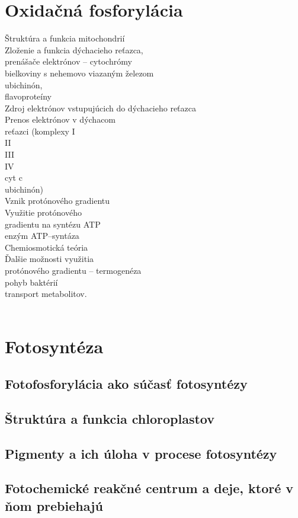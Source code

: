 \section{Oxidačná fosforylácia}
Štruktúra a funkcia mitochondrií\\
Zloženie a funkcia dýchacieho reťazca,\\
prenášače elektrónov -- cytochrómy\\
\tab bielkoviny s nehemovo viazaným železom\\
\tab ubichinón,\\
flavoproteíny\\
Zdroj elektrónov vstupujúcich do dýchacieho reťazca\\
Prenos elektrónov v dýchacom\\
reťazci (komplexy I\\
\tab II\\
\tab III\\
\tab IV\\
\tab cyt c\\
\tab ubichinón)\\
Vznik protónového gradientu\\
Využitie protónového\\
gradientu na syntézu ATP\\
\tab enzým ATP--syntáza\\
Chemiosmotická teória\\
Ďalšie možnosti využitia\\
protónového gradientu -- termogenéza\\
\tab pohyb baktérií\\
\tab transport metabolitov.\\
\\
\section{Fotosyntéza}
\subsection*{Fotofosforylácia ako súčasť fotosyntézy}
\subsection*{Štruktúra a funkcia chloroplastov}
\subsection*{Pigmenty a ich úloha v procese fotosyntézy}
\subsection*{Fotochemické reakčné centrum a deje, ktoré v ňom prebiehajú}
